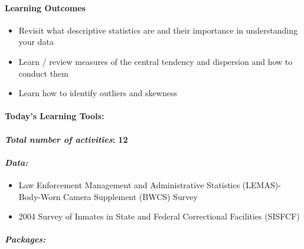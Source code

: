 \documentclass[
]{book}
\providecommand{\tightlist}{%
  \setlength{\itemsep}{0pt}\setlength{\parskip}{0pt}}
\begin{document}
\hypertarget{learning-outcomes-3}{%
\paragraph*{\texorpdfstring{\textbf{Learning Outcomes}}{Learning Outcomes}}\label{learning-outcomes-3}}

\begin{itemize}
\tightlist
\item
  Revisit what descriptive statistics are and their importance in understanding your data
\item
  Learn / review measures of the central tendency and dispersion and how to conduct them
\item
  Learn how to identify outliers and skewness
\end{itemize}

\hypertarget{todays-learning-tools-3}{%
\paragraph*{\texorpdfstring{\textbf{Today's Learning Tools:}}{Today's Learning Tools:}}\label{todays-learning-tools-3}}

\hypertarget{total-number-of-activities-12-1}{%
\paragraph*{\texorpdfstring{\emph{Total number of activities}: 12}{Total number of activities: 12}}\label{total-number-of-activities-12-1}}

\hypertarget{data-3}{%
\paragraph*{\texorpdfstring{\emph{Data:}}{Data:}}\label{data-3}}

\begin{itemize}
\tightlist
\item
  Law Enforcement Management and Administrative Statistics (LEMAS)-Body-Worn Camera Supplement (BWCS) Survey
\item
  2004 Survey of Inmates in State and Federal Correctional Facilities (SISFCF)
\end{itemize}

\hypertarget{packages-4}{%
\paragraph*{\texorpdfstring{\emph{Packages:}}{Packages:}}\label{packages-4}}
\end{document}
